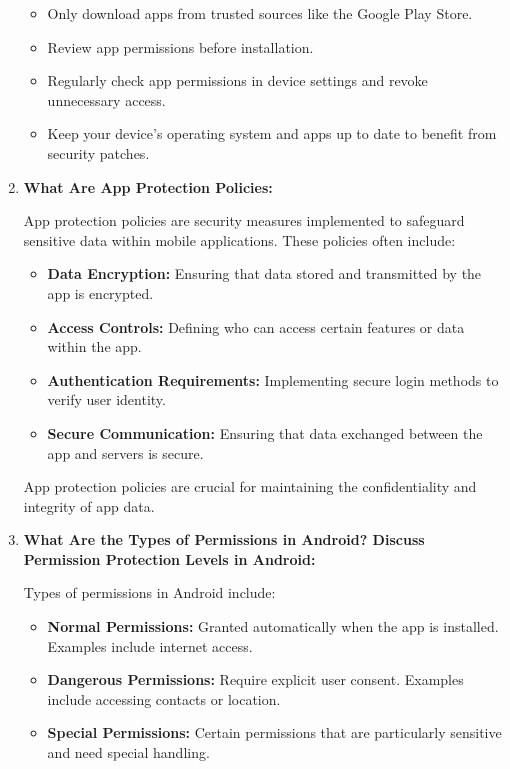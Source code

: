 \documentclass[11pt]{article}
\begin{document}
\begin{enumerate}
    \begin{itemize}
        \item Only download apps from trusted sources like the Google Play Store.
        \item Review app permissions before installation.
        \item Regularly check app permissions in device settings and revoke unnecessary access.
        \item Keep your device's operating system and apps up to date to benefit from security patches.
    \end{itemize}
    
    \item \textbf{What Are App Protection Policies:}
    
    App protection policies are security measures implemented to safeguard sensitive data within mobile applications. These policies often include:
    
    \begin{itemize}
        \item \textbf{Data Encryption:} Ensuring that data stored and transmitted by the app is encrypted.
        \item \textbf{Access Controls:} Defining who can access certain features or data within the app.
        \item \textbf{Authentication Requirements:} Implementing secure login methods to verify user identity.
        \item \textbf{Secure Communication:} Ensuring that data exchanged between the app and servers is secure.
    \end{itemize}
    
    App protection policies are crucial for maintaining the confidentiality and integrity of app data.
    
    \item \textbf{What Are the Types of Permissions in Android? Discuss Permission Protection Levels in Android:}
    
    Types of permissions in Android include:
    
    \begin{itemize}
        \item \textbf{Normal Permissions:} Granted automatically when the app is installed. Examples include internet access.
        \item \textbf{Dangerous Permissions:} Require explicit user consent. Examples include accessing contacts or location.
        \item \textbf{Special Permissions:} Certain permissions that are particularly sensitive and need special handling.
    \end{itemize}
    

\end{enumerate}
\end{document}
